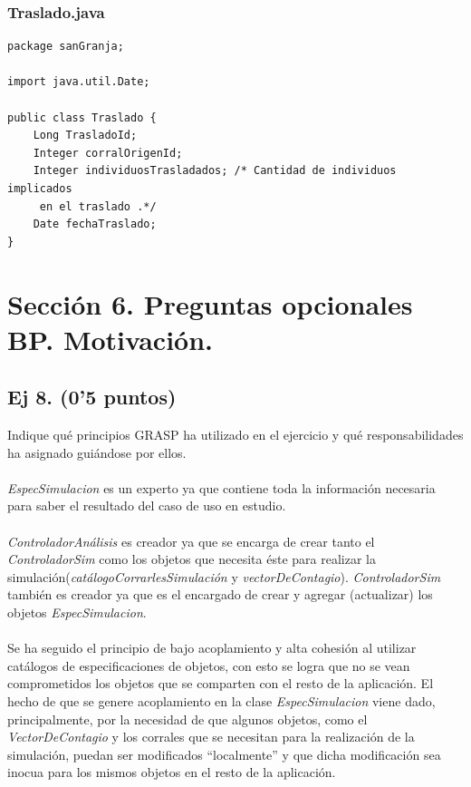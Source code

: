 \documentclass[a4paper]{article}
\begin{document}
\subsubsection{Traslado.java}
\begin{lstlisting}
package sanGranja;

import java.util.Date;

public class Traslado {
	Long TrasladoId;
	Integer corralOrigenId;
	Integer individuosTrasladados; /* Cantidad de individuos implicados 
	 en el traslado .*/
	Date fechaTraslado;
}

\end{lstlisting}

\section{Sección 6. Preguntas opcionales BP. Motivación.}
\subsection{Ej 8. (0’5 puntos)}
Indique qué principios GRASP ha utilizado en el ejercicio y qué responsabilidades ha asignado guiándose por ellos.
\paragraph{}
\textit{EspecSimulacion} es un experto ya que contiene toda la información necesaria para saber el resultado del caso de uso en estudio.
\paragraph{}\textit{ControladorAnálisis} es creador ya que se encarga de crear tanto el \textit{ControladorSim} como los objetos que necesita éste para realizar la simulación(\textit{catálogoCorrarlesSimulación} y \textit{vectorDeContagio}). \textit{ControladorSim} también es creador ya que es el encargado de crear y agregar (actualizar) los objetos \textit{EspecSimulacion}.
\paragraph{}Se ha seguido el principio de bajo acoplamiento y alta cohesión al utilizar catálogos de especificaciones de objetos, con esto se logra que no se vean comprometidos los objetos que se comparten con el resto de la aplicación. El hecho de que se genere acoplamiento en la clase \textit{EspecSimulacion} viene dado, principalmente, por la necesidad de que algunos objetos, como el \textit{VectorDeContagio} y los corrales que se necesitan para la realización de la simulación, puedan ser modificados ``localmente'' y que dicha modificación sea inocua para los mismos objetos en el resto de la aplicación.
\end{document}

